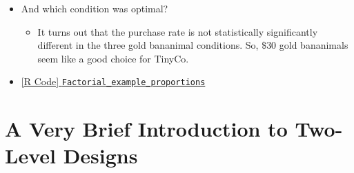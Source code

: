 \begin{itemize}
\begin{itemize}
            \end{itemize}
      \item And which condition was optimal?
            \begin{itemize}
                  \item It turns out that the purchase rate is not statistically significantly different in
                        the three gold bananimal conditions. So, $ \$30 $ gold bananimals seem like a good choice for TinyCo.
            \end{itemize}
      \item \href{https://github.com/Hextical/university-notes/blob/master/year-3/semester-3/STAT 430/code/W8/Factorial_example_proportions.R}{[R Code] \texttt{Factorial\_example\_proportions}}
\end{itemize}
\section*{A Very Brief Introduction to Two-Level Designs}
